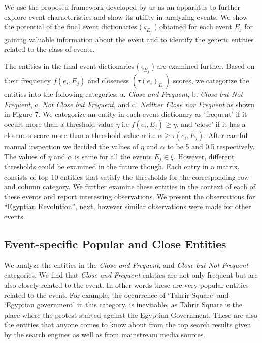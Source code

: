 
We use the proposed framework developed by us as an apparatus to further explore event characteristics and show its utility in analyzing events. We show the potential of the final event dictionaries ($\varsigma_{E_{j}}$) obtained for each event $E_{j}$ for gaining valuable information about the event and to identify the generic entities related to the class of events. 

The entities in the final event dictionaries ($\varsigma_{E_{j}}$) are examined further. Based on their frequency $f(e_{i},E_{j})$ and closeness $(\tau(e_{i})_{E_{j}})$ scores, we categorize the entities into the following categories: a. \textit{Close and Frequent}, b. \textit{Close but Not Frequent}, c. \textit{Not Close but Frequent}, and d. \textit{Neither Close nor Frequent} as shown in Figure 7. We categorize an entity in each event dictionary as `frequent' if it occurs more than a threshold value $\eta$ i.e $f(e_{i},E_{j}) \ge \eta$, and `close' if it has   a closeness score more than a threshold value $\alpha$ i.e $\alpha \ge \tau(e_{i},E_{j})$. After careful manual inspection we decided the values of $\eta$ and $\alpha$ to be 5 and 0.5 respectively. The values of $\eta$ and $\alpha$ is same for all the events $E_{j} \in \xi$. However, different thresholds could be examined in the future though. Each entry in a matrix, consists of top 10 entities that satisfy the thresholds for the corresponding row and column category. We further examine  these entities in the context of each of these events and report interesting observations. We present the observations for ``Egyptian Revolution'', next, however similar observations were made for other events.



\subsection{\textbf{Event-specific Popular and Close Entities}}
We analyze the entities in the \textit{Close and Frequent}, and \textit{Close but Not Frequent} categories. We find that \textit{Close and Frequent} entities are not only frequent but are also closely related to the event. In other words these are very popular entities related to the event. For example, the occurrence of `Tahrir Square' and `Egyptian government' in this category, is inevitable, as Tahrir Square is the place where the protest started against the Egyptian Government. These are also the entities that anyone comes to know about from the top search results given by the search engines as well as from mainstream media sources. 

